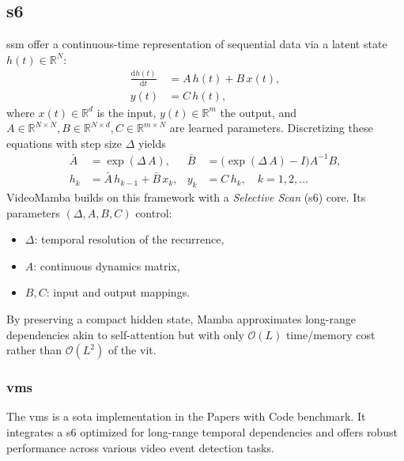 \subsection{\acrfull{s6}}
\label{ssec:s6}

\acrfull{ssm} offer a continuous-time representation of sequential data via a latent state \(h(t)\in\mathbb{R}^N\):
\begin{align}
    \frac{\mathrm{d}h(t)}{\mathrm{d}t} &= A\,h(t) + B\,x(t),  \label{eq:ssm_continuous1}\\
    y(t) &= C\,h(t),                                    \label{eq:ssm_continuous2}
\end{align}
where \(x(t)\in\mathbb{R}^d\) is the input, \(y(t)\in\mathbb{R}^m\) the output, and \(A\in\mathbb{R}^{N\times N}, B\in\mathbb{R}^{N\times d}, C\in\mathbb{R}^{m\times N}\) are learned parameters.  Discretizing these equations with step size \(\Delta\) yields
\begin{align}
    \bar A &= \exp(\Delta\,A), 
    & 
    \bar B &= \bigl(\exp(\Delta\,A)-I\bigr)A^{-1}B,\\
    h_k &= \bar A\,h_{k-1} + \bar B\,x_k, 
    &
    y_k &= C\,h_k,
    \quad k=1,2,\dots
\end{align}
VideoMamba \cite{li_videomamba_2024} builds on this framework with a \emph{Selective Scan} (\acrshort{s6}) core.  Its parameters \((\Delta, A,B,C)\) control:
\begin{itemize}
    \item \(\Delta\): temporal resolution of the recurrence,
    \item \(A\): continuous dynamics matrix,
    \item \(B,C\): input and output mappings.
\end{itemize}

By preserving a compact hidden state, Mamba approximates long-range dependencies akin to self-attention but with only \(\mathcal{O}(L)\) time/memory cost rather than \(\mathcal{O}(L^2)\) of the \acrlong{vit}.  

\subsubsection{\acrfull{vms}}
The \acrfull{vms} is a \acrfull{sota} implementation in the Papers with Code benchmark. It integrates a \acrlong{s6} optimized for long-range temporal dependencies and offers robust performance across various video event detection tasks. 

